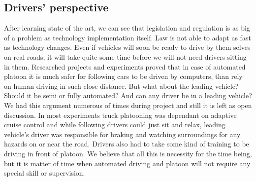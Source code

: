 \subsection{Drivers' perspective}
After learning state of the art, we can see that legislation and regulation is as big of a problem as technology implementation itself. Law is not able to adapt as fast as technology changes. Even if vehicles will soon be ready to drive by them selves on real roads, it will take quite some time before we will not need drivers sitting in them. Researched projects and experiments proved that in case of automated platoon it is much safer for following cars to be driven by computers, than rely on human driving in such close distance. But what about the leading vehicle? Should it be semi or fully automated? And can any driver be in a leading vehicle? We had this argument numerous of times during project and still it is left as open discussion. In most experiments truck platooning was dependant on adaptive cruise control and while following drivers could just sit and relax, leading vehicle's driver was responsible for braking and watching surroundings for any hazards on or near the road. Drivers also had to take some kind of training to be driving in front of platoon. We believe that all this is necessity for the time being, but it is matter of time when automated driving and platoon will not require any special skill or supervision.
%